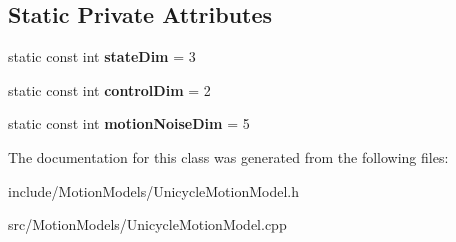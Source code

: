 \subsection*{\-Static \-Private \-Attributes}
\begin{DoxyCompactItemize}
\item 
\hypertarget{class_unicycle_motion_model_a419ce60de8ab632ca7a77e80c8c3cdfa}{static const int {\bfseries state\-Dim} = 3}\label{class_unicycle_motion_model_a419ce60de8ab632ca7a77e80c8c3cdfa}

\item 
\hypertarget{class_unicycle_motion_model_a1902c45c50d76f9ccdc50f605ef29540}{static const int {\bfseries control\-Dim} = 2}\label{class_unicycle_motion_model_a1902c45c50d76f9ccdc50f605ef29540}

\item 
\hypertarget{class_unicycle_motion_model_a7bea8e301903e72bb5bc7d8c953f1681}{static const int {\bfseries motion\-Noise\-Dim} = 5}\label{class_unicycle_motion_model_a7bea8e301903e72bb5bc7d8c953f1681}

\end{DoxyCompactItemize}


\-The documentation for this class was generated from the following files\-:\begin{DoxyCompactItemize}
\item 
include/\-Motion\-Models/\-Unicycle\-Motion\-Model.\-h\item 
src/\-Motion\-Models/\-Unicycle\-Motion\-Model.\-cpp\end{DoxyCompactItemize}
